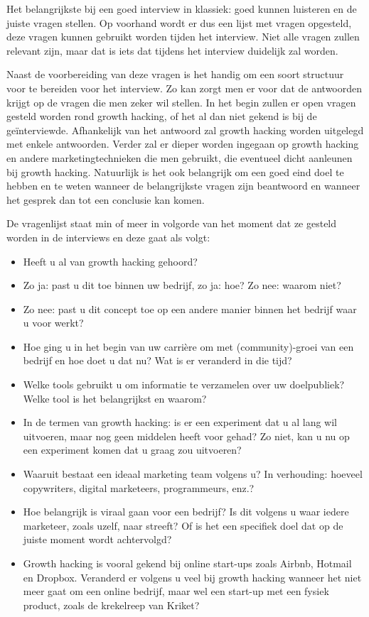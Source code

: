 Het belangrijkste bij een goed interview in klassiek: goed kunnen luisteren en de juiste vragen stellen. Op voorhand wordt er dus een lijst met vragen opgesteld, deze vragen kunnen gebruikt worden tijden het interview. Niet alle vragen zullen relevant zijn, maar dat is iets dat tijdens het interview duidelijk zal worden.

Naast de voorbereiding van deze vragen is het handig om een soort structuur voor te bereiden voor het interview. Zo kan zorgt men er voor dat de antwoorden krijgt op de vragen die men zeker wil stellen. In het begin zullen er open vragen gesteld worden rond growth hacking, of het al dan niet gekend is bij de geïnterviewde. Afhankelijk van het antwoord zal growth hacking worden uitgelegd met enkele antwoorden. Verder zal er dieper worden ingegaan op growth hacking en andere marketingtechnieken die men gebruikt, die eventueel dicht aanleunen bij growth hacking. Natuurlijk is het ook belangrijk om een goed eind doel te hebben en te weten wanneer de belangrijkste vragen zijn beantwoord en wanneer het gesprek dan tot een conclusie kan komen.

De vragenlijst staat min of meer in volgorde van het moment dat ze gesteld worden in de interviews en deze gaat als volgt:
\begin{itemize} 
	\item Heeft u al van growth hacking gehoord?
	\item Zo ja: past u dit toe binnen uw bedrijf, zo ja: hoe? Zo nee: waarom niet?
	\item Zo nee: past u dit concept toe op een andere manier binnen het bedrijf waar u voor werkt?
	\item Hoe ging u in het begin van uw carrière om met (community)-groei van een bedrijf en hoe doet u dat nu? Wat is er veranderd in die tijd?
	\item Welke tools gebruikt u om informatie te verzamelen over uw doelpubliek? Welke tool is het belangrijkst en waarom?
	\item In de termen van growth hacking: is er een experiment dat u al lang wil uitvoeren, maar nog geen middelen heeft voor gehad? Zo niet, kan u nu op een experiment komen dat u graag zou uitvoeren?
	\item Waaruit bestaat een ideaal marketing team volgens u? In verhouding: hoeveel copywriters, digital marketeers, programmeurs, enz.?
	\item Hoe belangrijk is viraal gaan voor een bedrijf? Is dit volgens u waar iedere marketeer, zoals uzelf, naar streeft? Of is het een specifiek doel dat op de juiste moment wordt achtervolgd?
	\item Growth hacking is vooral gekend bij online start-ups zoals Airbnb, Hotmail en Dropbox. Veranderd er volgens u veel bij growth hacking wanneer het niet meer gaat om een online bedrijf, maar wel een start-up met een fysiek product, zoals de krekelreep van Kriket? 
\end{itemize}

